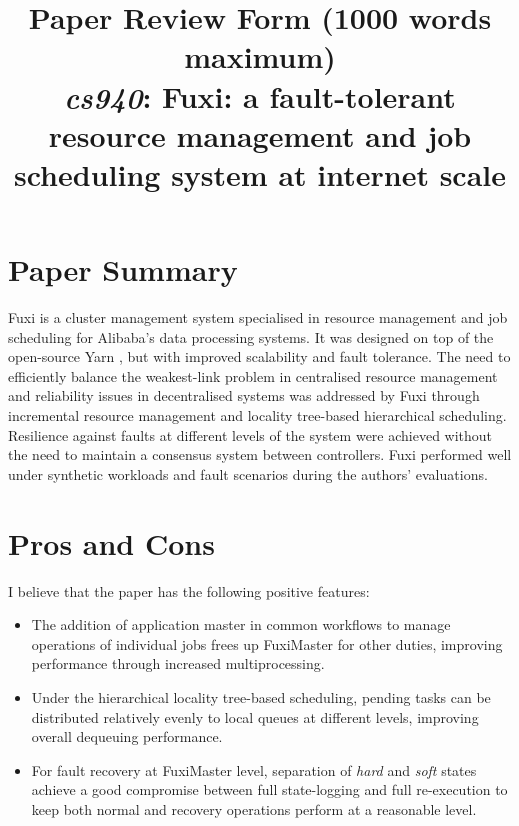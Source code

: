 \documentclass[11pt]{article}
\begin{document}
\title{Paper Review Form (1000 words maximum)\\
  \emph{cs940}: Fuxi: a fault-tolerant resource management and job scheduling system at internet scale \cite{zhang2014fuxi}}
\maketitle

\section*{Paper Summary}

Fuxi is a cluster management system specialised in resource management and job scheduling for Alibaba's data processing systems. It was designed on top of the open-source Yarn \cite{vavilapalli2013apache}, but with improved scalability and fault tolerance. The need to efficiently balance the weakest-link problem in centralised resource management and reliability issues in decentralised systems was addressed by Fuxi through incremental resource management and locality tree-based hierarchical scheduling. Resilience against faults at different levels of the system were achieved without the need to maintain a consensus system between controllers. Fuxi performed well under synthetic workloads and fault scenarios during the authors' evaluations.

\section*{Pros and Cons}

I believe that the paper has the following positive features:
\begin{itemize}
	\item The addition of application master in common workflows to manage operations of individual jobs frees up FuxiMaster for other duties, improving performance through increased multiprocessing.
	\item Under the hierarchical locality tree-based scheduling, pending tasks can be distributed relatively evenly to local queues at different levels, improving overall dequeuing performance.
	\item For fault recovery at FuxiMaster level, separation of \emph{hard} and \emph{soft} states achieve a good compromise between full state-logging and full re-execution to keep both normal and recovery operations perform at a reasonable level.
\end{itemize}
\end{document}

